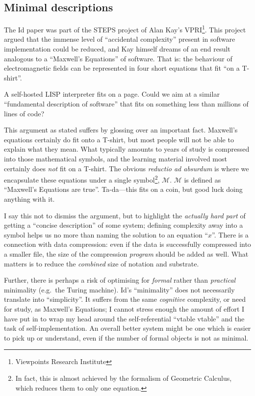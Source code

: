 \hypertarget{minimal-descriptions}{%
\subsection{Minimal descriptions}\label{minimal-descriptions}}

The Id{} paper was part of the STEPS project of Alan Kay's
VPRI\footnote{Viewpoints Research Institute}. This project argued that
the immense level of ``accidental complexity'' present in software
implementation could be reduced, and Kay himself dreams of an end result
analogous to a ``Maxwell's Equations'' of software. That is: the
behaviour of electromagnetic fields can be represented in four short
equations that fit ``on a T-shirt''.

A self-hosted LISP interpreter fits on a page. Could we aim at a similar
``fundamental description of software'' that fits on something less than
millions of lines of code?

This argument as stated suffers by glossing over an important fact.
Maxwell's equations certainly do fit onto a T-shirt, but most people
will not be able to explain what they mean. What typically amounts to
years of study is compressed into those mathematical symbols, and the
learning material involved most certainly does \emph{not} fit on a
T-shirt. The obvious \emph{reductio ad absurdum} is where we encapsulate
these equations under a single symbol\footnote{In fact, this is almost
  achieved by the formalism of Geometric Calculus, which reduces them to
  only one equation.}, \(\mathcal{M}\). \(\mathcal{M}\) is defined as
``Maxwell's Equations are true''. Ta-da---this fits on a coin, but good
luck doing anything with it.

I say this not to dismiss the argument, but to highlight the
\emph{actually hard part} of getting a ``concise description'' of some
system; defining complexity away into a symbol helps us no more than
naming the solution to an equation ``\(x\)''. There is a connection with
data compression: even if the data is successfully compressed into a
smaller file, the size of the compression \emph{program} should be added
as well. What matters is to reduce the \emph{combined} size of notation
and substrate.

Further, there is perhaps a risk of optimising for \emph{formal} rather
than \emph{practical} minimality (e.g.~the Turing machine). Id{}'s
``minimality'' does not necessarily translate into ``simplicity''. It
suffers from the same \emph{cognitive} complexity, or need for study, as
Maxwell's Equations; I cannot stress enough the amount of effort I have
put in to wrap my head around the self-referential ``vtable vtable'' and
the task of self-implementation. An overall better system might be one
which is easier to pick up or understand, even if the number of formal
objects is not as minimal.

